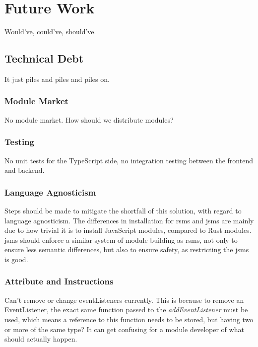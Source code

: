 \chapter{Future Work}

Would've, could've, should've.


\section{Technical Debt}

It just piles and piles and piles on.

\subsection{Module Market}

No module market. How should we distribute modules?

\subsection{Testing}

No unit tests for the TypeScript side, no integration testing between the
frontend and backend.

\subsection{Language Agnosticism}

Steps should be made to mitigate the shortfall of this solution, with regard to
language agnosticism. The differences in installation for \gls*{rsms} and
\gls*{jsms} are mainly due to how trivial it is to install JavaScript modules,
compared to Rust modules. \gls*{jsms} should enforce a similar system of module
building as \gls*{rsms}, not only to ensure less semantic differences, but also
to ensure safety, as restricting the \gls*{jsms} is good.

\subsection{Attribute and Instructions}

Can't remove or change eventListeners currently. This is because to remove an
EventListener, the exact same function passed to the \textit{addEventListener}
must be used, which means a reference to this function needs to be stored, but
having two or more of the same type? It can get confusing for a module developer
of what should actually happen.

